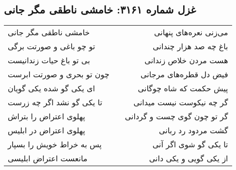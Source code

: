 \begin{center}
\section*{غزل شماره ۳۱۶۱: خامشی ناطقی مگر جانی}
\label{sec:3161}
\begin{longtable}{l p{0.5cm} r}
خامشی ناطقی مگر جانی
&&
می‌زنی نعره‌های پنهانی
\\
تو چو باغی و صورتت برگی
&&
باغ چه صد هزار چندانی
\\
بی تو باغ حیات زندانیست
&&
هست مردن خلاص زندانی
\\
چون تو بحری و صورتت ابرست
&&
فیض دل قطره‌های مرجانی
\\
ای یکی گو شده یکی گویان
&&
پیش حکمت که شاه چوگانی
\\
تا یکی گو نشد اگر چه زرست
&&
گر چه نیکوست نیست میدانی
\\
پهلوی اعتراض را بتراش
&&
گر تو چون گوی چست و گردانی
\\
پهلوی اعتراض در ابلیس
&&
گشت مردود رد ربانی
\\
پس به خراط خویش را بسپار
&&
تا یکی گو شوی اگر آنی
\\
مانعست اعتراض ابلیسی
&&
از یکی گویی و یکی دانی
\\
\end{longtable}
\end{center}
